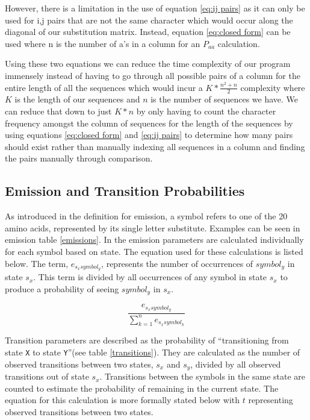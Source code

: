 \documentclass[a4paper,11pt]{article}
\begin{document}
However, there is a limitation in the use of equation \ref{eq:ij pairs} as it can only be used for i,j pairs that are not the same character which would occur along the diagonal of our substitution matrix. Instead, equation \ref{eq:closed form} can be used where n is the number of a's in a column for an ${P_{aa}}$ calculation.

Using these two equations we can reduce the time complexity of our program immensely instead of having to go through all possible pairs of a column for the entire length of all the sequences which would incur a $K * \frac{n^{2} + n}{2}$ complexity where $K$ is the length of our sequences and $n$ is the number of sequences we have. We can reduce that down to just  $K * n$ by only having to count the character frequency amongst the column of sequences for the length of the sequences by using equations \ref{eq:closed form} and \ref{eq:ij pairs} to determine how many pairs should exist rather than manually indexing all sequences in a column and finding the pairs manually through comparison.





\subsection{Emission and Transition Probabilities}

As introduced in the definition for emission, a symbol refers to one of the 20 amino acids, represented by its single letter substitute. Examples can be seen in emission table \ref{emissions}. In the emission parameters are calculated individually for each symbol based on state. The equation used for these calculations is listed below. The term, $e_{s_{x}symbol_y}$, represents the number of occurrences of $symbol_y$ in state $s_x$. This term is divided by all occurrences of any symbol in state $s_x$ to produce a probability of seeing $symbol_y$ in $s_x$.

\begin{equation}
    \frac{e_{s_{x}symbol_y}}{\sum_{k=1}^n e_{s_xsymbol_k}}
\end{equation}


Transition parameters are described as the probability of ``transitioning from state \verb+X+ to state \verb+Y+''(see table \ref{transitions}). They are calculated as the number of observed transitions between two states, $s_x$ and $s_y$, divided by all observed transitions out of state $s_x$. Transitions between the symbols in the same state are counted to estimate the probability of remaining in the current state. The equation for this calculation is more formally stated below with $t$ representing observed transitions between two states.
\end{document}

